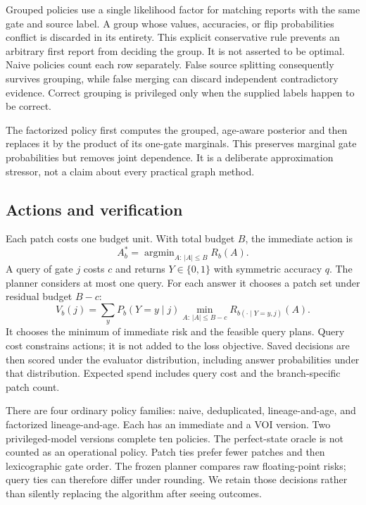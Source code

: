 \documentclass[manuscript,screen,nonacm]{acmart}
\begin{document}
Grouped policies use a single likelihood factor for matching reports with the same gate and source label. A group whose values, accuracies, or flip probabilities conflict is discarded in its entirety. This explicit conservative rule prevents an arbitrary first report from deciding the group. It is not asserted to be optimal. Naive policies count each row separately. False source splitting consequently survives grouping, while false merging can discard independent contradictory evidence. Correct grouping is privileged only when the supplied labels happen to be correct.

The factorized policy first computes the grouped, age-aware posterior and then replaces it by the product of its one-gate marginals. This preserves marginal gate probabilities but removes joint dependence. It is a deliberate approximation stressor, not a claim about every practical graph method.

\subsection{Actions and verification}
Each patch costs one budget unit. With total budget $B$, the immediate action is
\begin{equation}
 A_b^*=\mathop{\arg\min}_{A:\,|A|\le B}R_b(A).
\end{equation}
A query of gate $j$ costs $c$ and returns $Y\in\{0,1\}$ with symmetric accuracy $q$. The planner considers at most one query. For each answer it chooses a patch set under residual budget $B-c$:
\begin{equation}
 V_b(j)=\sum_y P_b(Y=y\mid j)\min_{A:\,|A|\le B-c}R_{b(\cdot\mid Y=y,j)}(A).
\end{equation}
It chooses the minimum of immediate risk and the feasible query plans. Query cost constrains actions; it is not added to the loss objective. Saved decisions are then scored under the evaluator distribution, including answer probabilities under that distribution. Expected spend includes query cost and the branch-specific patch count.

There are four ordinary policy families: naive, deduplicated, lineage-and-age, and factorized lineage-and-age. Each has an immediate and a VOI version. Two privileged-model versions complete ten policies. The perfect-state oracle is not counted as an operational policy. Patch ties prefer fewer patches and then lexicographic gate order. The frozen planner compares raw floating-point risks; query ties can therefore differ under rounding. We retain those decisions rather than silently replacing the algorithm after seeing outcomes.
\end{document}
